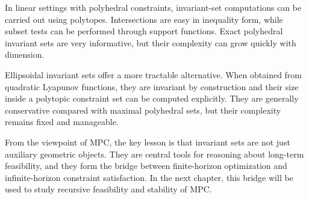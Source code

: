 In linear settings with polyhedral constraints, invariant-set computations can be carried out using
polytopes. Intersections are easy in inequality form, while subset tests can be performed through
support functions. Exact polyhedral invariant sets are very informative, but their complexity can
grow quickly with dimension.

Ellipsoidal invariant sets offer a more tractable alternative. When obtained from quadratic
Lyapunov functions, they are invariant by construction and their size inside a polytopic constraint
set can be computed explicitly. They are generally conservative compared with maximal polyhedral
sets, but their complexity remains fixed and manageable.

From the viewpoint of MPC, the key lesson is that invariant sets are not just auxiliary geometric
objects. They are central tools for reasoning about long-term feasibility, and they form the bridge
between finite-horizon optimization and infinite-horizon constraint satisfaction. In the next chapter,
this bridge will be used to study recursive feasibility and stability of MPC.